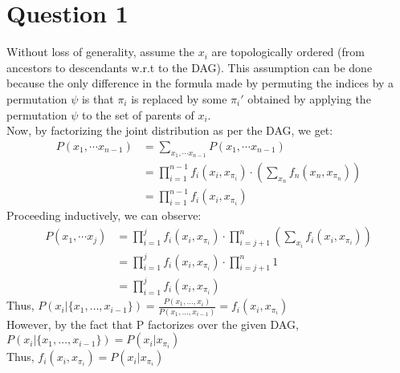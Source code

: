 \section{Question 1}
Without loss of generality, assume the $x_i$ are topologically ordered (from ancestors to descendants w.r.t to the DAG). This assumption can be done because the only difference in the formula made by permuting the indices by a permutation $\psi$ is that $\pi_i$ is replaced by some $\pi_i'$ obtained by applying the permutation $\psi$ to the set of parents of $x_i$.\\
Now, by factorizing the joint distribution as per the DAG, we get:
\begin{align*}
    P(x_1,\cdots x_{n-1})&=\sum_{x_1,\cdots x_{n-1}} P(x_1,\cdots x_{n-1})\\
    &=\prod_{i=1}^{n-1} f_i(x_i, x_{\pi_i})\cdot \left(\sum_{x_n} f_n(x_n, x_{\pi_n})\right)\\
    &=\prod_{i=1}^{n-1} f_i(x_i, x_{\pi_i})
\end{align*}
Proceeding inductively, we can observe:
\begin{align*}
    P(x_1,\cdots x_j)&=\prod_{i=1}^j f_i(x_i, x_{\pi_i})\cdot \prod_{i=j+1}^n \left(\sum_{x_i} f_i(x_i, x_{\pi_i})\right)\\
    &=\prod_{i=1}^j f_i(x_i, x_{\pi_i})\cdot \prod_{i=j+1}^n 1\\
    &=\prod_{i=1}^j f_i(x_i, x_{\pi_i})
\end{align*}
Thus, $P(x_i|\{x_1,\ldots, x_{i-1}\}) = \frac{P(x_1,\ldots, x_i)}{P(x_1,\ldots, x_{i-1})} = f_i(x_i, x_{\pi_i})$\\
However, by the fact that P factorizes over the given DAG, $P(x_i|\{x_1,\ldots, x_{i-1}\}) = P(x_i|x_{\pi_i})$\\
Thus, $f_i(x_i, x_{\pi_i}) = P(x_i|x_{\pi_i})$\\